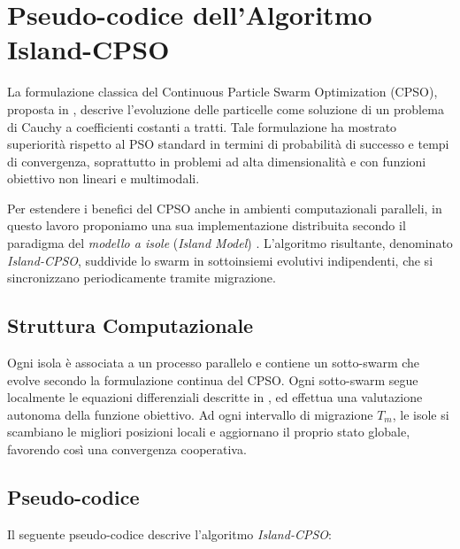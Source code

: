 \documentclass{article}
\begin{document}
\section{Pseudo-codice dell'Algoritmo Island-CPSO}

La formulazione classica del Continuous Particle Swarm Optimization (CPSO), proposta in \cite{professoressa}, 
descrive l'evoluzione delle particelle come soluzione di un problema di Cauchy a coefficienti costanti a tratti. 
Tale formulazione ha mostrato superiorità rispetto al PSO standard in termini di probabilità di successo 
e tempi di convergenza, soprattutto in problemi ad alta dimensionalità e con funzioni obiettivo non 
lineari e multimodali.

Per estendere i benefici del CPSO anche in ambienti computazionali paralleli, in questo lavoro 
proponiamo una sua implementazione distribuita secondo il paradigma del \textit{modello a isole} 
(\textit{Island Model}) \cite{tomassini2005spatially, cantupaz1998survey}. L'algoritmo risultante, 
denominato \textit{Island-CPSO}, suddivide lo swarm in sottoinsiemi evolutivi indipendenti, che si 
sincronizzano periodicamente tramite migrazione.

\subsection{Struttura Computazionale}

Ogni isola è associata a un processo parallelo e contiene un sotto-swarm che evolve secondo la 
formulazione continua del CPSO. Ogni sotto-swarm segue localmente le equazioni differenziali descritte 
in \cite{professoressa}, ed effettua una valutazione autonoma della funzione obiettivo. Ad ogni 
intervallo di migrazione $T_m$, le isole si scambiano le migliori posizioni locali e aggiornano il 
proprio stato globale, favorendo così una convergenza cooperativa.

\subsection{Pseudo-codice}

Il seguente pseudo-codice descrive l’algoritmo \textit{Island-CPSO}:
\end{document}
